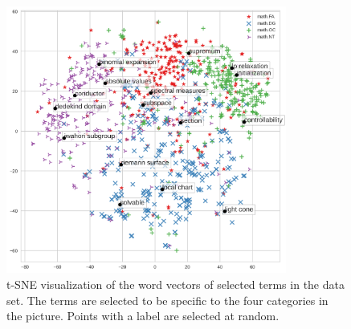 \documentclass[submission,copyright,creativecommons]{eptcs}
\begin{document}
\begin{figure}
    \centering
    \includegraphics[width=0.82\textwidth]{m80p300opt135.png}
    \caption{\label{scatter} t-SNE visualization of the word vectors
        of selected terms in the data set. The terms are selected to be specific to 
        the four categories in the picture.  Points with a label are selected
    at random.}
\end{figure}
  



\end{document}
